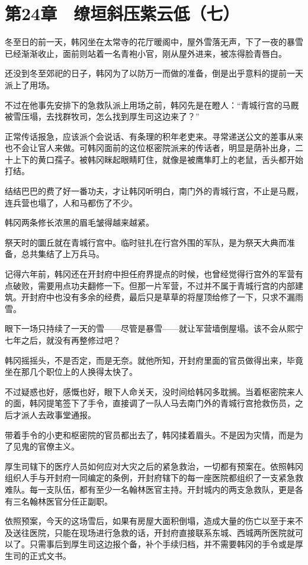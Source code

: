 \section{第24章　缭垣斜压紫云低（七）}

冬至日的前一天，韩冈坐在太常寺的花厅暖阁中，屋外雪落无声，下了一夜的暴雪已经渐渐收止，面前则站着一名青袍小官，刚从屋外进来，被冻得脸青唇白。

还没到冬至郊祀的日子，韩冈为了以防万一而做的准备，倒是出乎意料的提前一天派上了用场。

不过在他事先安排下的急救队派上用场之前，韩冈先是在瞪人：“青城行宫的马厩被雪压塌，去找群牧司，怎么找到厚生司这边来了？”

正常传话报急，应该派个会说话、有条理的积年老吏来。寻常递送公文的差事从来也不会让官人来做。可韩冈面前的这位枢密院派来的传话者，明显是荫补出身，二十上下的黄口孺子。被韩冈眯起眼睛盯住，就像是被鹰隼盯上的老鼠，舌头都开始打结。

结结巴巴的费了好一番功夫，才让韩冈听明白，南门外的青城行宫，不止是马厩，连兵营也塌了，人和马都伤了不少。

韩冈两条修长浓黑的眉毛皱得越来越紧。

祭天时的圜丘就在青城行宫中。临时驻扎在行宫外围的军队，是为祭天大典而准备，总共集结了上万兵马。

记得六年前，韩冈还在开封府中担任府界提点的时候，也曾经觉得行宫外的军营有点破败，需要用点功夫翻修一下。但那一片军营，不过并不属于青城行宫的内部建筑。开封府中也没有多余的经费，最后只是草草的将屋顶给修了一下，只求不漏雨雪。

眼下一场只持续了一天的雪——尽管是暴雪——就让军营墙倒屋塌。该不会从熙宁七年之后，就没有再整修过吧？

韩冈摇摇头，不是否定，而是无奈。就他所知，开封府里面的官员做得出来，毕竟坐在那几个职位上的人换得太快了。

不过疑惑也好，感慨也好，眼下人命关天，没时间给韩冈多耽搁。当着枢密院来人的面，韩冈提笔签下了手令，直接调了一队人马去南门外的青城行宫抢救伤员，之后才派人去政事堂通报。

带着手令的小吏和枢密院的官员都出去了，韩冈揉着眉头。不是因为灾情，而是为了见鬼的官僚主义。

厚生司辖下的医疗人员如何应对大灾之后的紧急救治，一切都有预案在。依照韩冈组织人手与开封府一同编定的条例，开封府辖下的每一座医院都组织了一支紧急救难队。每一支队伍，都有至少一名翰林医官主持。开封城内的两支急救队，更是各有三名翰林医官分任正副职。

依照预案，今天的这场雪后，如果有房屋大面积倒塌，造成大量的伤亡以至于来不及送往医院，只能在现场进行急救的话，开封府直接联系东城、西城两所医院就可以了。只需事后到厚生司这边报个备，补个手续归档，并不需要韩冈的手令或是厚生司的正式文书。

